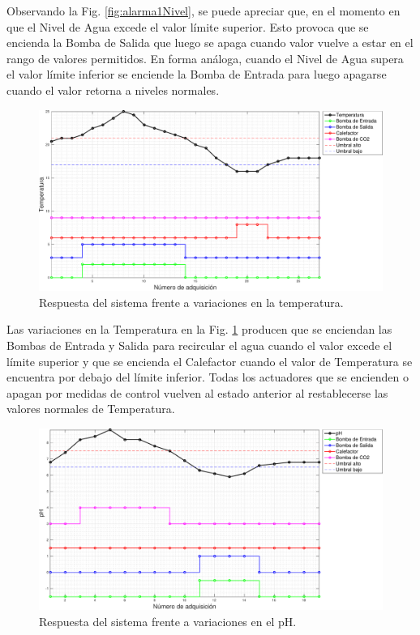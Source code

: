 Observando la Fig. \ref{fig:alarma1Nivel}, se puede apreciar que, en el momento en que el Nivel de Agua excede el valor límite superior. Esto provoca que se encienda la Bomba de Salida que luego se apaga cuando valor vuelve a estar en el rango de valores permitidos.  En forma análoga, cuando el Nivel de Agua supera el valor límite inferior se enciende la Bomba de Entrada para luego apagarse cuando el valor retorna a niveles normales.

\begin{figure}[h]
\centering
    \includegraphics[width=\textwidth]{./Figures/plot1Temp.pdf}
	\caption{Respuesta del sistema frente a variaciones en la temperatura.}
	\label{fig:alarma1Temp}
\end{figure}

Las variaciones en la Temperatura en la Fig. \ref{fig:alarma1Temp} producen que se enciendan las Bombas de Entrada y Salida para recircular el agua cuando el valor excede el límite superior y que se encienda el Calefactor cuando el valor de Temperatura se encuentra por debajo del límite inferior.  Todas los actuadores que se encienden o apagan por medidas de control vuelven al estado anterior al restablecerse las valores normales de Temperatura.

\begin{figure}[h]
\centering
    \includegraphics[width=\textwidth]{./Figures/plot1pH.pdf}
	\caption{Respuesta del sistema frente a variaciones en el pH.}
	\label{fig:alarma1pH}
\end{figure}

